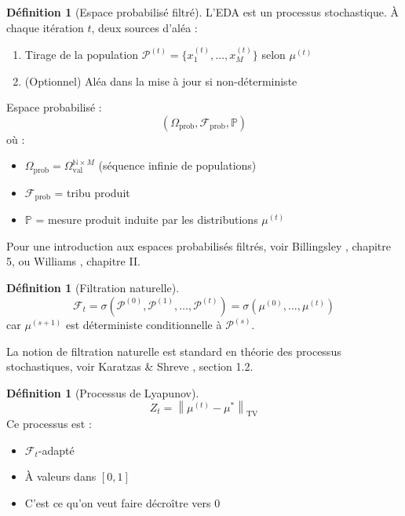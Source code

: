 \documentclass[12pt,a4paper]{article}
\theoremstyle{definition}
\newtheorem{definition}[theorem]{Définition}
\theoremstyle{remark}
\newcommand{\N}{\mathbb{N}}
\newcommand{\Prob}{\mathbb{P}}
\newcommand{\TV}{\text{TV}}
\newcommand{\norm}[1]{\left\|#1\right\|}
\begin{document}
	\begin{definition}[Espace probabilisé filtré]
		L'EDA est un processus stochastique. À chaque itération $t$, deux sources d'aléa :
		\begin{enumerate}
			\item Tirage de la population $\mathcal{P}^{(t)} = \{x_1^{(t)}, \ldots, x_M^{(t)}\}$ selon $\mu^{(t)}$
			\item (Optionnel) Aléa dans la mise à jour si non-déterministe
		\end{enumerate}
		
		Espace probabilisé :
		\begin{equation}
			(\Omega_{\text{prob}}, \mathcal{F}_{\text{prob}}, \Prob)
		\end{equation}
		où :
		\begin{itemize}
			\item $\Omega_{\text{prob}} = \Omega_{\text{val}}^{\N \times M}$ (séquence infinie de populations)
			\item $\mathcal{F}_{\text{prob}}$ = tribu produit
			\item $\Prob$ = mesure produit induite par les distributions $\mu^{(t)}$
		\end{itemize}
		
		Pour une introduction aux espaces probabilisés filtrés, voir Billingsley \cite{billingsley1995probability}, chapitre 5, ou Williams \cite{williams1991probability}, chapitre II.
	\end{definition}
	
	\begin{definition}[Filtration naturelle]
		\begin{equation}
			\mathcal{F}_t = \sigma(\mathcal{P}^{(0)}, \mathcal{P}^{(1)}, \ldots, \mathcal{P}^{(t)}) = \sigma(\mu^{(0)}, \ldots, \mu^{(t)})
		\end{equation}
		car $\mu^{(s+1)}$ est déterministe conditionnelle à $\mathcal{P}^{(s)}$.
		
		La notion de filtration naturelle est standard en théorie des processus stochastiques, voir Karatzas \& Shreve \cite{karatzas1991brownian}, section 1.2.
	\end{definition}
	
	\begin{definition}[Processus de Lyapunov]
		\begin{equation}
			Z_t = \norm{\mu^{(t)} - \mu^*}_{\TV}
		\end{equation}
		Ce processus est :
		\begin{itemize}
			\item $\mathcal{F}_t$-adapté
			\item À valeurs dans $[0, 1]$
			\item C'est ce qu'on veut faire décroître vers 0
		\end{itemize}
	\end{definition}
	
\end{document}
